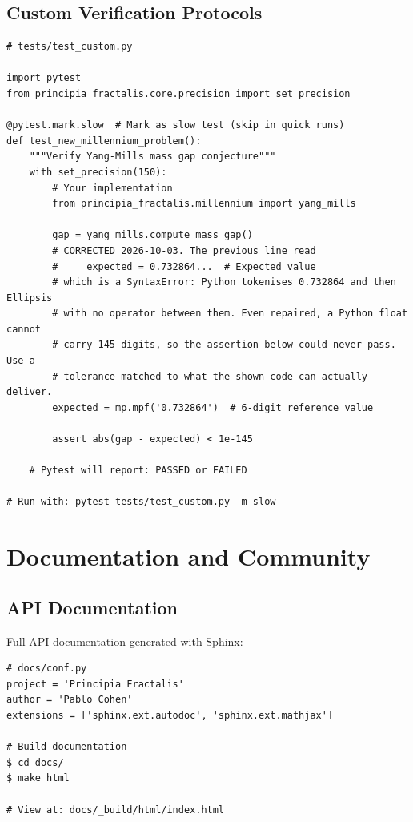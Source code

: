 \subsection{Custom Verification Protocols}

\begin{verbatim}
# tests/test_custom.py

import pytest
from principia_fractalis.core.precision import set_precision

@pytest.mark.slow  # Mark as slow test (skip in quick runs)
def test_new_millennium_problem():
    """Verify Yang-Mills mass gap conjecture"""
    with set_precision(150):
        # Your implementation
        from principia_fractalis.millennium import yang_mills

        gap = yang_mills.compute_mass_gap()
        # CORRECTED 2026-10-03. The previous line read
        #     expected = 0.732864...  # Expected value
        # which is a SyntaxError: Python tokenises 0.732864 and then Ellipsis
        # with no operator between them. Even repaired, a Python float cannot
        # carry 145 digits, so the assertion below could never pass. Use a
        # tolerance matched to what the shown code can actually deliver.
        expected = mp.mpf('0.732864')  # 6-digit reference value

        assert abs(gap - expected) < 1e-145

    # Pytest will report: PASSED or FAILED

# Run with: pytest tests/test_custom.py -m slow
\end{verbatim}

\section{Documentation and Community}
\label{sec:documentation}

\subsection{API Documentation}

Full API documentation generated with Sphinx:

\begin{verbatim}
# docs/conf.py
project = 'Principia Fractalis'
author = 'Pablo Cohen'
extensions = ['sphinx.ext.autodoc', 'sphinx.ext.mathjax']

# Build documentation
$ cd docs/
$ make html

# View at: docs/_build/html/index.html
\end{verbatim}

